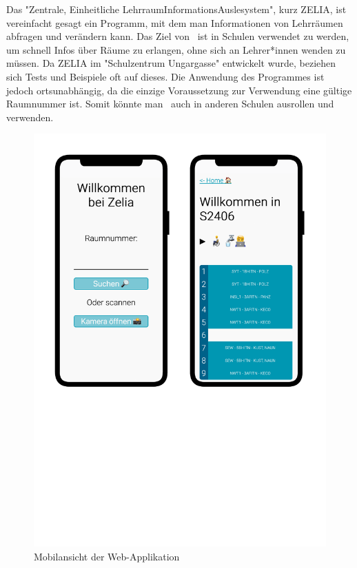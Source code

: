 

Das "Zentrale, Einheitliche LehrraumInformationsAuslesystem", kurz ZELIA, ist vereinfacht gesagt ein Programm, mit dem man Informationen von Lehrräumen abfragen und verändern kann. Das Ziel von \ZELIA\ ist in Schulen verwendet zu werden, um schnell Infos über Räume zu erlangen, ohne sich an Lehrer*innen wenden zu müssen. Da \mbox{ZELIA} im "Schulzentrum Ungargasse" entwickelt wurde, beziehen sich Tests und Beispiele oft auf dieses. Die Anwendung des Programmes ist jedoch ortsunabhängig, da die einzige Voraussetzung zur Verwendung eine gültige Raumnummer ist. Somit könnte man \ZELIA\ auch in anderen Schulen ausrollen und verwenden. 

\begin{figure}[H]
    \centering
    \includegraphics[width=120mm]{media/Intro/frontend_mobile.svg.pdf}
    \caption{Mobilansicht der Web-Applikation}
\end{figure}

